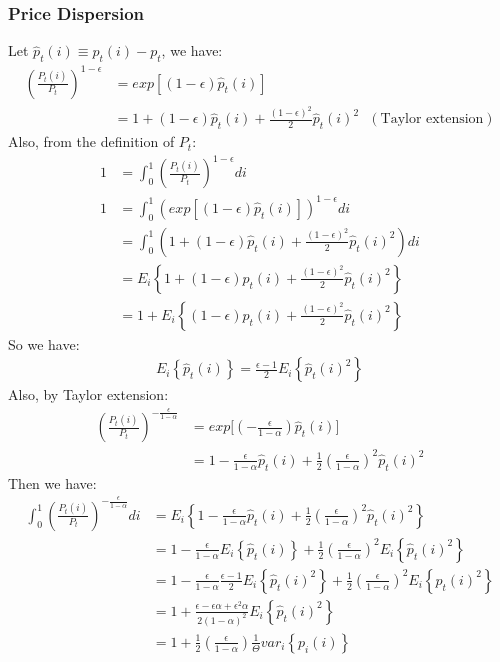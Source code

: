 \documentclass{article}
\numberwithin{equation}{section}
\begin{document}
\subsubsection{Price Dispersion}
Let $\hat{p}_t(i) \equiv p_t(i) - p_t$, we have:
	\begin{align*}
		\left( \frac{P_t(i)}{P_t} \right)^{1-\epsilon} &= exp[(1 - \epsilon)\hat{p}_t(i)]\\
		&= 1 + (1 - \epsilon)\hat{p}_t(i) + \frac{(1 - \epsilon)^2}{2}\hat{p}_t(i)^2\ \ \ (\text{Taylor extension})
	\end{align*}
Also, from the definition of $P_t$:
	\begin{align*}
		1 &= \int^1_0 \left( \frac{P_t(i)}{P_t} \right)^{1-\epsilon} di\\
		1 &= \int^1_0 \left( exp[(1 - \epsilon)\hat{p}_t(i)] \right)^{1-\epsilon} di\\
		&= \int^1_0 \left( 1 + (1 - \epsilon)\hat{p}_t(i) + \frac{(1 - \epsilon)^2}{2}\hat{p}_t(i)^2 \right) di\\
		&= E_i \left\{ 1 + (1 - \epsilon)\hat{p}_t(i) + \frac{(1 - \epsilon)^2}{2}\hat{p}_t(i)^2 \right\}\\
		&= 1 + E_i \left\{ (1 - \epsilon)\hat{p}_t(i) + \frac{(1 - \epsilon)^2}{2}\hat{p}_t(i)^2 \right\}
	\end{align*}
So we have:
	\begin{align*}
		E_i \left\{ \hat{p}_t(i) \right\} = \frac{\epsilon-1}{2} E_i \left\{ \hat{p}_t(i)^2 \right\}
	\end{align*}
Also, by Taylor extension:
	\begin{align*}
		\left( \frac{P_t(i)}{P_t} \right)^{-\frac{\epsilon}{1-\alpha}} &= exp\bigg[\left( -\frac{\epsilon}{1-\alpha} \right)\hat{p}_t(i) \bigg]\\
		&= 1  -\frac{\epsilon}{1-\alpha}\hat{p}_t(i) + \frac{1}{2}  \left( \frac{\epsilon}{1-\alpha} \right)^2\hat{p}_t(i)^2
	\end{align*}
Then we have:
	\begin{align*}
		\int^1_0 \left( \frac{P_t(i)}{P_t} \right)^{-\frac{\epsilon}{1-\alpha}} di &= E_i \left\{ 1  -\frac{\epsilon}{1-\alpha}\hat{p}_t(i) + \frac{1}{2}  \left( \frac{\epsilon}{1-\alpha} \right)^2\hat{p}_t(i)^2 \right\}\\
		&= 1  -\frac{\epsilon}{1-\alpha} E_i \left\{ \hat{p}_t(i) \right\} + \frac{1}{2}  \left( \frac{\epsilon}{1-\alpha} \right)^2 E_i \left\{ \hat{p}_t(i)^2 \right\}\\
		&= 1  -\frac{\epsilon}{1-\alpha} \frac{\epsilon-1}{2} E_i \left\{ \hat{p}_t(i)^2 \right\} + \frac{1}{2}  \left( \frac{\epsilon}{1-\alpha} \right)^2 E_i \left\{ \hat{p}_t(i)^2 \right\}\\
		&= 1 + \frac{\epsilon - \epsilon\alpha + \epsilon^2\alpha}{2(1 - \alpha)^2} E_i \left\{ \hat{p}_t(i)^2 \right\}\\
		&= 1 + \frac{1}{2} \left( \frac{\epsilon}{1 - \alpha} \right) \frac{1}{\Theta} var_i \left\{ p_i(i) \right\}
	\end{align*}
\end{document}
